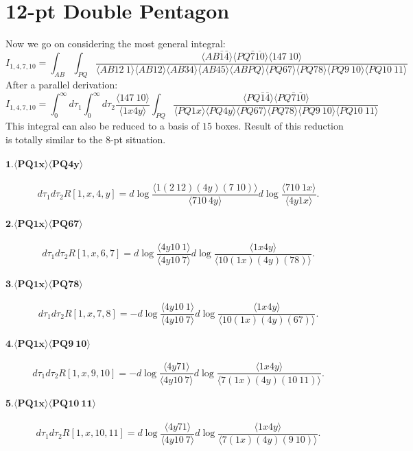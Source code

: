 \documentclass[10pt]{article}
\def\<{\langle}
\def\>{\rangle}
\begin{document}
\section{12-pt Double Pentagon}
Now we go on considering the most general integral:
\begin{equation}
I_{1,4,7,10}=\int_{AB}\int_{PQ}\frac{\<AB\bar1\bar4\>\<PQ\bar7\overline{10}\>\<147\ 10\>}{\<AB12\ 1\>\<AB12\>\<AB34\>\<AB45\>\<ABPQ\>\<PQ67\>\<PQ78\>\<PQ9\ 10\>\<PQ10\
 11\>}
\end{equation}
After a parallel derivation:
\begin{equation}
I_{1,4,7,10}=\int_0^{\infty}d\tau_1\int_0^{\infty}d\tau_2\frac{\<147\ 10\>}{\<1x4y\>}\int_{PQ}\frac{\< PQ\bar1\bar4\> \<PQ\bar7\bar{10}\>}{\<PQ1x\>\<PQ4y\>\<PQ67\>\<PQ78\>\<PQ9\ 10\>\<PQ10\
 11\>}
\end{equation}
This integral can also be reduced to a basis of $15$ boxes. Result of this reduction is totally similar to the $8$-pt situation.

\paragraph{$\mathbf{1.\<PQ1x\>\<PQ4y\>}$}

\[
    d\tau_1 d\tau_2 R[1,x,4,y]
    =d\log \frac{\<1(2\ 12)(4y)(7\ 10)\>}{\<710\ 4y\>}d\log \frac{\<710\ 1x\>}{\<4y1x\>}.
\]
\paragraph{$\mathbf{2.\<PQ1x\>\<PQ67\>}$}
\[
    d\tau_1 d\tau_2 R[1,x,6,7]
    =d\log \frac{\<4y10\ 1\>}{\<4y10\ 7\>}d\log \frac{\<1x4y\>}{\<10(1x)(4y)(78)\>}.
\]
\paragraph{$\mathbf{3.\<PQ1x\>\<PQ78\>}$}
\[
    d\tau_1 d\tau_2 R[1,x,7,8]
    =-d\log \frac{\<4y10\ 1\>}{\<4y10\ 7\>}d\log \frac{\<1x4y\>}{\<10(1x)(4y)(67)\>}.
\]
\paragraph{$\mathbf{4.\<PQ1x\>\<PQ9\ 10\>}$}
\[
    d\tau_1 d\tau_2 R[1,x,9,10]
    =-d\log \frac{\<4y71\>}{\<4y10\ 7\>}d\log \frac{\<1x4y\>}{\<7(1x)(4y)(10\ 11)\>}.
\]
\paragraph{$\mathbf{5.\<PQ1x\>\<PQ10\ 11\>}$}
\[
    d\tau_1 d\tau_2 R[1,x,10,11]
    =d\log \frac{\<4y71\>}{\<4y10\ 7\>}d\log \frac{\<1x4y\>}{\<7(1x)(4y)(9\ 10)\>}.
\]
\end{document}
